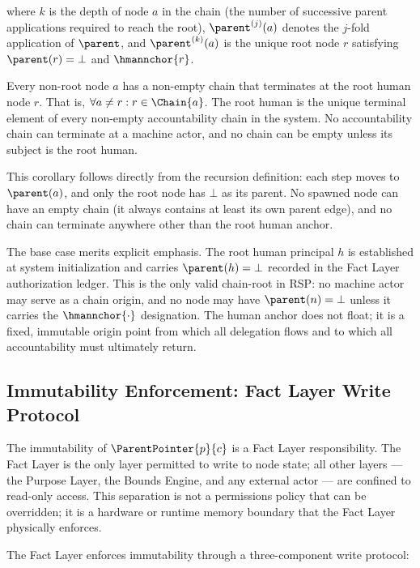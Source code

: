 where $k$ is the depth of node $a$ in the chain (the number of successive parent applications required to reach the root), $\parent^{(j)}(a)$ denotes the $j$-fold application of $\parent$, and $\parent^{(k)}(a)$ is the unique root node $r$ satisfying $\parent(r) = \bot$ and $\hmannchor{r}$.

\begin{corrollary}
\label{cor:unique-human-termination}
Every non-root node $a$ has a non-empty chain that terminates at the root human node $r$. That is, $\forall a \neq r: r \in \Chain{a}$. The root human is the unique terminal element of every non-empty accountability chain in the system. No accountability chain can terminate at a machine actor, and no chain can be empty unless its subject is the root human.
\end{corrollary}

This corollary follows directly from the recursion definition: each step moves to $\parent(a)$, and only the root node has $\bot$ as its parent. No spawned node can have an empty chain (it always contains at least its own parent edge), and no chain can terminate anywhere other than the root human anchor.

The base case merits explicit emphasis. The root human principal $h$ is established at system initialization and carries $\parent(h) = \bot$ recorded in the Fact Layer authorization ledger. This is the only valid chain-root in RSP: no machine actor may serve as a chain origin, and no node may have $\parent(n) = \bot$ unless it carries the $\hmannchor{\cdot}$ designation. The human anchor does not float; it is a fixed, immutable origin point from which all delegation flows and to which all accountability must ultimately return.

\subsection{Immutability Enforcement: Fact Layer Write Protocol}
\label{sec:immutability-enforcement}

The immutability of $\ParentPointer{p}{c}$ is a Fact Layer responsibility. The Fact Layer is the only layer permitted to write to node state; all other layers --- the Purpose Layer, the Bounds Engine, and any external actor --- are confined to read-only access. This separation is not a permissions policy that can be overridden; it is a hardware or runtime memory boundary that the Fact Layer physically enforces.

The Fact Layer enforces immutability through a three-component write protocol:

